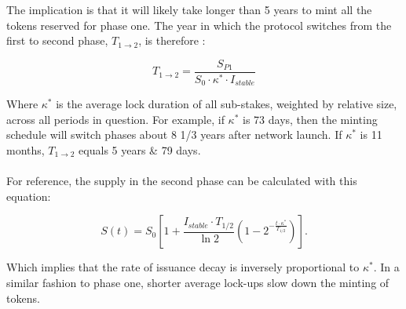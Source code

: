 \documentclass[8pt]{article}
\begin{document}
The implication is that it will likely take longer than 5 years to mint all the tokens reserved for phase one. The year in which the protocol switches from the first to second phase, $T_{1\rightarrow2}$, is therefore : 

\begin{equation}
    T_{1\rightarrow2}= \frac{S_{P1}}{S_0 \cdot \kappa^* \cdot I_{stable}}
\end{equation}

Where $\kappa^*$ is the average lock duration of all sub-stakes, weighted by relative size, across all periods in question. For example, if $\kappa^*$ is 73 days, then the minting schedule will switch phases about 8 1/3 years after network launch. If $\kappa^*$ is 11 months, $T_{1\rightarrow2}$ equals 5 years \& 79 days. 
\\\\
For reference, the supply in the second phase can be calculated with this equation: 

\begin{equation}
    S(t) = S_0 \left[1 + \frac{I_{stable} \cdot T_{1/2}}{\ln{2}}\left(1 - 2^{-\frac{t \cdot \kappa^*}{T_{1/2}}} \right) \right].
\end{equation}

Which implies that the rate of issuance decay is inversely proportional to $\kappa^*$. In a similar fashion to phase one, shorter average lock-ups slow down the minting of tokens. 
\end{document}
